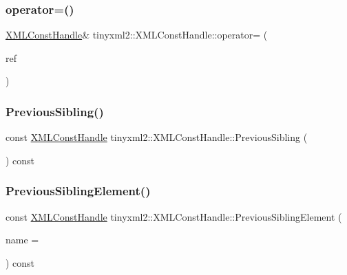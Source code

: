 \subsubsection{\texorpdfstring{operator=()}{operator=()}}
{\footnotesize\ttfamily \hyperlink{classtinyxml2_1_1_x_m_l_const_handle}{X\+M\+L\+Const\+Handle}\& tinyxml2\+::\+X\+M\+L\+Const\+Handle\+::operator= (\begin{DoxyParamCaption}\item[{const \hyperlink{classtinyxml2_1_1_x_m_l_const_handle}{X\+M\+L\+Const\+Handle} \&}]{ref }\end{DoxyParamCaption})\hspace{0.3cm}{\ttfamily [inline]}}

\mbox{\label{classtinyxml2_1_1_x_m_l_const_handle_acf68cc7930e4ac883e0c7e16ef2fbb66}} 
\subsubsection{\texorpdfstring{Previous\+Sibling()}{PreviousSibling()}}
{\footnotesize\ttfamily const \hyperlink{classtinyxml2_1_1_x_m_l_const_handle}{X\+M\+L\+Const\+Handle} tinyxml2\+::\+X\+M\+L\+Const\+Handle\+::\+Previous\+Sibling (\begin{DoxyParamCaption}{ }\end{DoxyParamCaption}) const\hspace{0.3cm}{\ttfamily [inline]}}

\mbox{\label{classtinyxml2_1_1_x_m_l_const_handle_aef99308659f2617299ac29980769a91e}} 
\subsubsection{\texorpdfstring{Previous\+Sibling\+Element()}{PreviousSiblingElement()}}
{\footnotesize\ttfamily const \hyperlink{classtinyxml2_1_1_x_m_l_const_handle}{X\+M\+L\+Const\+Handle} tinyxml2\+::\+X\+M\+L\+Const\+Handle\+::\+Previous\+Sibling\+Element (\begin{DoxyParamCaption}\item[{const char $\ast$}]{name = {} }\end{DoxyParamCaption}) const\hspace{0.3cm}{\ttfamily [inline]}}

